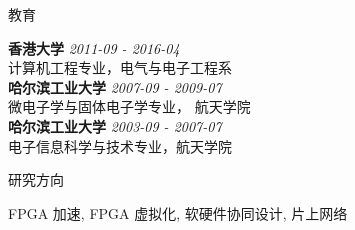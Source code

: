 \documentclass{resume} %
\begin{document}
\begin{rSection}{教育}

{\bf 香港大学} \hfill {\em 2011-09 - 2016-04} \\ 
计算机工程专业，电气与电子工程系\\
{\bf 哈尔滨工业大学} \hfill {\em 2007-09 - 2009-07} \\
微电子学与固体电子学专业， 航天学院\\
{\bf 哈尔滨工业大学} \hfill {\em 2003-09 - 2007-07} \\
电子信息科学与技术专业，航天学院 \\

\end{rSection}

\begin{rSection}{研究方向}
    \vspace{-1em}
\item FPGA 加速, FPGA 虚拟化, 软硬件协同设计, 片上网络
    \vspace{-0.5em}
\end{rSection}
\end{document}
